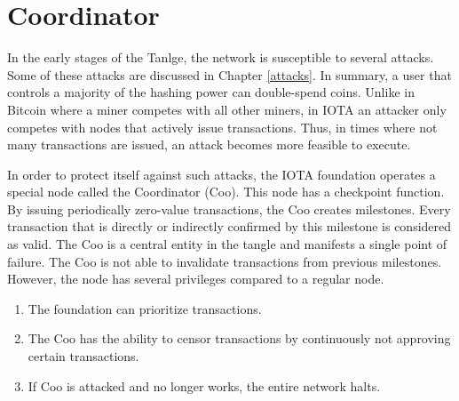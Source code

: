 \section{Coordinator}\label{coordinator}
In the early stages of the Tanlge, the network is susceptible to several attacks. Some of these attacks are discussed in Chapter \ref{attacks}. In summary, a user that controls a majority of the hashing power can double-spend coins. Unlike in Bitcoin where a miner competes with all other miners, in IOTA an attacker only competes with nodes that actively issue transactions. Thus, in times where not many transactions are issued, an attack becomes more feasible to execute.

In order to protect itself against such attacks, the IOTA foundation operates a special node called the Coordinator (Coo). This node has a checkpoint function. By issuing periodically zero-value transactions, the Coo creates milestones. Every transaction that is directly or indirectly confirmed by this milestone is considered as valid. The Coo is a central entity in the tangle and manifests a single point of failure. The Coo is not able to invalidate transactions from previous milestones. However, the node has several privileges compared to a regular node.

\begin{enumerate}
    \item The foundation can prioritize transactions.
    \item The Coo has the ability to censor transactions by continuously not approving certain transactions.
    \item If Coo is attacked and no longer works, the entire network halts.
\end{enumerate}

